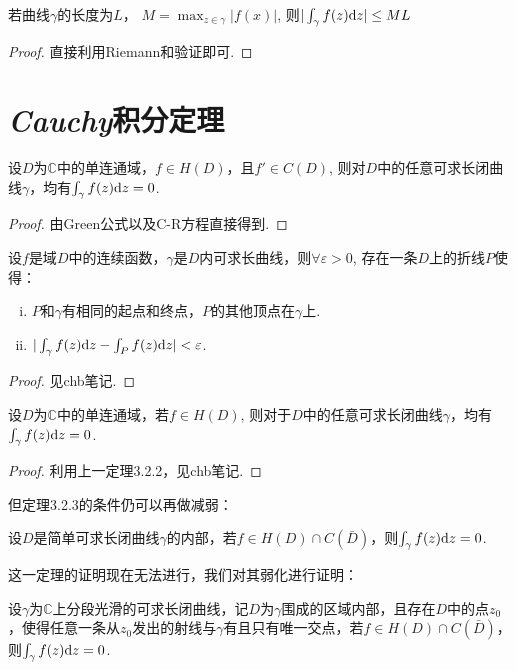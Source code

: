 \begin{mypro}[长大不等式]
	
	若曲线$\gamma$的长度为$L$， $M = \max_{z \in \gamma} \vert f(x) \vert$,
	则$ \vert \int_\gamma  f(z) \mathrm{d}z \vert \leq ML$
\end{mypro}
\begin{proof}
	直接利用Riemann和验证即可.
\end{proof}

\section{\emph{Cauchy}积分定理}
\begin{mypro}
	设$D$为$\mathbb{C}$中的单连通域，$f \in H(D)$，且$f' \in C(D)$, 则对$D$中的任意可求长闭曲线$\gamma$，均有$\int_\gamma f(z) \mathrm{d}z = 0$.
\end{mypro}
\begin{proof}
	由Green公式以及C-R方程直接得到.
\end{proof}

\begin{mypro}
	设$f$是域$D$中的连续函数，$\gamma$是$D$内可求长曲线，则$\forall \varepsilon > 0$, 存在一条$D$上的折线$P$使得：
	\begin{enumerate}[(i)]
		\item $P$和$\gamma$有相同的起点和终点，$P$的其他顶点在$\gamma$上.
		\item $\vert \int_\gamma f(z) \mathrm{d}z - \int_Pf(z) \mathrm{d}z \vert < \varepsilon $.
	\end{enumerate}
\end{mypro}
\begin{proof}
	见chb笔记.
\end{proof}

\begin{mypro}
	设$D$为$\mathbb C$中的单连通域，若$f \in H(D)$, 则对于$D$中的任意可求长闭曲线$\gamma$，均有$\int_\gamma f(z) \mathrm{d}z = 0$.
\end{mypro}
\begin{proof}
	利用上一定理3.2.2，见chb笔记.
\end{proof}

但定理3.2.3的条件仍可以再做减弱：
\begin{mypro}
	设$D$是简单可求长闭曲线$\gamma$的内部，若$f \in H(D) \cap C(\bar{D})$，则$\int_\gamma f(z) \mathrm{d}z = 0$.
\end{mypro}
这一定理的证明现在无法进行，我们对其弱化进行证明：

\addtocounter{mypro}{-1}
\begin{mypro}[*]
	设$\gamma$为$\mathbb{C}$上分段光滑的可求长闭曲线，记$D$为$\gamma$围成的区域内部，且存在$D$中的点$z_0$，使得任意一条从$z_0$发出的射线与$\gamma$有且只有唯一交点，若$f \in H(D) \cap C(\bar{D})$，则$\int_\gamma f(z) \mathrm{d}z = 0$.
\end{mypro}

